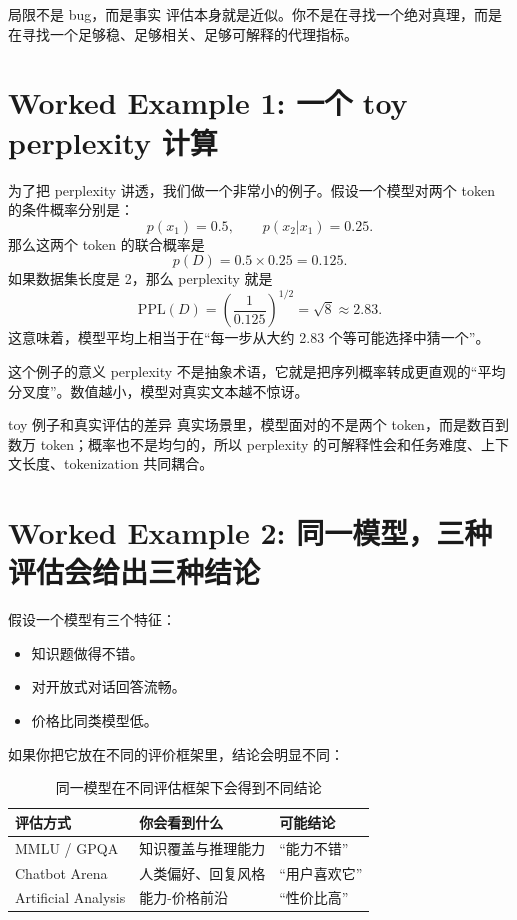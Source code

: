 \documentclass[a4paper]{article}
\begin{document}
\begin{importantbox}{局限不是 bug，而是事实}
评估本身就是近似。你不是在寻找一个绝对真理，而是在寻找一个足够稳、足够相关、足够可解释的代理指标。
\end{importantbox}

\section{Worked Example 1: 一个 toy perplexity 计算}

为了把 perplexity 讲透，我们做一个非常小的例子。假设一个模型对两个 token 的条件概率分别是：
\[
p(x_1)=0.5,\qquad p(x_2|x_1)=0.25.
\]
那么这两个 token 的联合概率是
\[
p(D)=0.5\times 0.25=0.125.
\]
如果数据集长度是 2，那么 perplexity 就是
\[
\mathrm{PPL}(D)=\left(\frac{1}{0.125}\right)^{1/2}=\sqrt{8}\approx 2.83.
\]
这意味着，模型平均上相当于在“每一步从大约 2.83 个等可能选择中猜一个”。

\begin{knowledgebox}{这个例子的意义}
perplexity 不是抽象术语，它就是把序列概率转成更直观的“平均分叉度”。数值越小，模型对真实文本越不惊讶。
\end{knowledgebox}

\begin{warningbox}{toy 例子和真实评估的差异}
真实场景里，模型面对的不是两个 token，而是数百到数万 token；概率也不是均匀的，所以 perplexity 的可解释性会和任务难度、上下文长度、tokenization 共同耦合。
\end{warningbox}

\section{Worked Example 2: 同一模型，三种评估会给出三种结论}

假设一个模型有三个特征：
\begin{itemize}
    \item 知识题做得不错。
    \item 对开放式对话回答流畅。
    \item 价格比同类模型低。
\end{itemize}

如果你把它放在不同的评价框架里，结论会明显不同：

\begin{table}[H]
\centering
\begin{tabular}{p{3.3cm}p{4.2cm}p{5.4cm}}
\toprule
\textbf{评估方式} & \textbf{你会看到什么} & \textbf{可能结论} \\
\midrule
MMLU / GPQA & 知识覆盖与推理能力 & “能力不错” \\
Chatbot Arena & 人类偏好、回复风格 & “用户喜欢它” \\
Artificial Analysis & 能力-价格前沿 & “性价比高” \\
\bottomrule
\end{tabular}
\caption{同一模型在不同评估框架下会得到不同结论}
\end{table}
\end{document}
